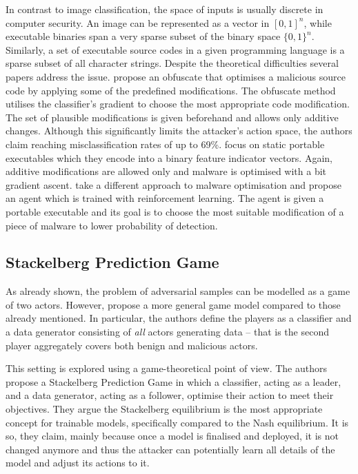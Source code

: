 In contrast to image classification, the space of inputs is usually
discrete in computer security. An image can be represented as a vector
in $[0, 1]^n$, while executable binaries span a very sparse subset of
the binary space $\{0, 1\}^n$. Similarly, a set of executable source
codes in a given programming language is a sparse subset of all
character strings. Despite the theoretical difficulties several papers
address the issue. \cite{adversarial_malware} propose an obfuscate that optimises
a malicious source code by applying some of the predefined
modifications. The obfuscate method utilises the classifier’s gradient
to choose the most appropriate code modification. The set of plausible
modifications is given beforehand and allows only additive changes.
Although this significantly limits the attacker’s action space, the
authors claim reaching misclassification rates of up to 69\%.
\cite{adversarial_malware_binary} focus on static portable executables which they encode
into a binary feature indicator vectors. Again, additive modifications
are allowed only and malware is optimised with a bit gradient ascent.
\cite{adversarial_malware_pe} take a different approach to malware optimisation and
propose an agent which is trained with reinforcement learning. The agent
is given a portable executable and its goal is to choose the most
suitable modification of a piece of malware to lower probability of
detection.

\subsection{Stackelberg Prediction Game}

As already shown, the problem of adversarial samples can be modelled as
a game of two actors. However, \cite{stackelberg_games} propose a more general
game model compared to those already mentioned. In particular, the
authors define the players as a classifier and a data generator
consisting of \emph{all} actors generating data – that is the second
player aggregately covers both benign and malicious actors.

This setting is explored using a game-theoretical point of view. The
authors propose a Stackelberg Prediction Game in which a classifier,
acting as a leader, and a data generator, acting as a follower, optimise
their action to meet their objectives. They argue the Stackelberg
equilibrium is the most appropriate concept for trainable models,
specifically compared to the Nash equilibrium. It is so, they claim,
mainly because once a model is finalised and deployed, it is not changed
anymore and thus the attacker can potentially learn all details of the
model and adjust its actions to it.

